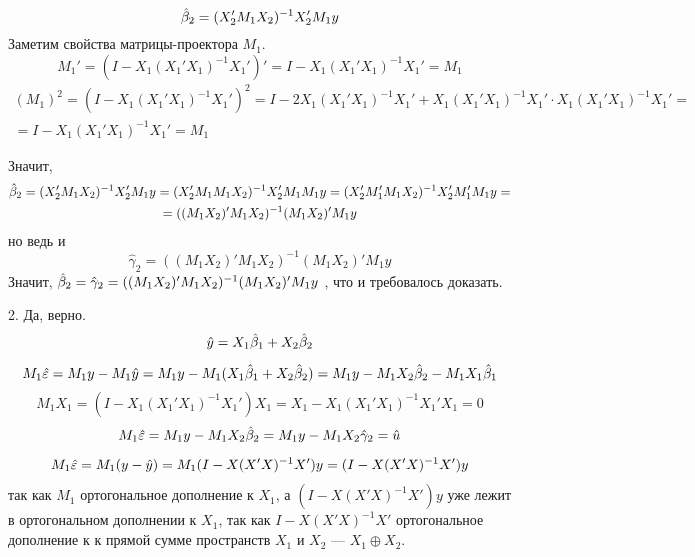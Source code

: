 \begin{problem}
\begin{sol}
\[\hat{\beta}_2=(X_2'M_1X_2)^{-1}X_2'M_1y\]
Заметим свойства матрицы-проектора $M_1$.
\[M_1'=(I-X_1(X_1'X_1)^{-1}X_1')'=I-X_1(X_1'X_1)^{-1}X_1'=M_1\]
\begin{multline*}
(M_1)^2=(I-X_1(X_1'X_1)^{-1}X_1')^2=I-2X_1(X_1'X_1)^{-1}X_1'+X_1(X_1'X_1)^{-1}X_1'\cdot X_1(X_1'X_1)^{-1}X_1'=\\
=I-X_1(X_1'X_1)^{-1}X_1'=M_1
\end{multline*}

Значит,
\begin{multline*}
\hat{\beta}_2=(X_2'M_1X_2)^{-1}X_2'M_1y=(X_2'M_1M_1X_2)^{-1}X_2'M_1M_1y=(X_2'M_1'M_1X_2)^{-1}X_2'M_1'M_1y=\\=
((M_1X_2)'M_1X_2)^{-1}(M_1X_2)'M_1y
\end{multline*}
но ведь и
\[
\hat\gamma_2=
((M_1X_2)'M_1X_2)^{-1}(M_1X_2)'M_1y
\]
Значит, $\hat{\beta}_2=\hat\gamma_2=
((M_1X_2)'M_1X_2)^{-1}(M_1X_2)'M_1y$
, что и требовалось доказать.

2. Да, верно.
\[\hat{y}=X_1\hat{\beta}_1+X_2\hat{\beta}_2\]

\[M_1 \hat{\varepsilon}=M_1y-M_1\hat{y}=M_1y-M_1(X_1\hat\beta_1+X_2\hat{\beta}_2)=M_1y-M_1X_2\hat{\beta}_2-M_1X_1\hat\beta_1\]
\[M_1X_1=(I-X_1(X_1'X_1)^{-1}X_1')X_1=X_1-X_1(X_1'X_1)^{-1}X_1'X_1=0\]
\[M_1 \hat{\varepsilon}=M_1y-M_1X_2\hat{\beta}_2=M_1y-M_1X_2\hat\gamma_2=\hat u\]

\begin{multline*}
M_1\hat{\varepsilon}=M_1(y-\hat{y})=M_1(I-X(X'X)^{-1}X')y=(I-X(X'X)^{-1}X')y
\end{multline*}
так как $M_1$ ортогональное дополнение к $X_1$, а $(I-X(X'X)^{-1}X')y$ уже лежит в ортогональном дополнении к $X_1$, так как $I-X(X'X)^{-1}X'$ ортогональное дополнение к к прямой сумме пространств $X_1$ и $X_2$ — $X_1\oplus X_2$.\end{sol}
\end{problem}




